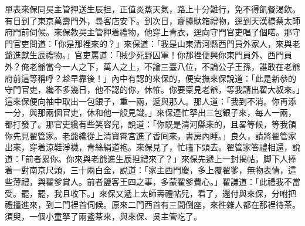 單表來保同吳主管押送生辰担，正值炎蒸天氣，路上十分難行，免不得飢餐渴飲。有日到了東京萬壽門外，尋客店安下。到次日，齎擡馱箱禮物，逕到天漢橋蔡太師府門前伺候。來保教吳主管押着禮物，他穿上青衣，逕向守門官吏唱了個喏。那守門官吏問道：「你是那裡來的？」來保道：「我是山東清河縣西門員外家人，{}來與老爺進獻生辰禮物。」官吏罵道：「賊少死野囚軍！你那裡便興你東門員外、西門員外？俺老爺當今一人之下，萬人之上，不論三臺八位，不論公子王孫，誰敢在老爺府前這等稱呼？{}趁早靠後！」內中有認的來保的，便安撫來保說道：「此是新叅的守門官吏，纔不多幾日，他不認的你，休恠。你要稟見老爺，等我請出翟大叔來。」這來保便向袖中取出一包銀子，重一兩，遞與那人。那人道：「我到不消。你再添一分，與那兩個官吏，休和他一般見識。」{}來保連忙拏出三包銀子來，每人一兩，都打發了。那官吏纔有些笑容兒，說道：「你既是清河縣來的，且畧等候，等我領你先見翟管家。老爺纔從上清寶霄宮進了香囘來，書房內睡。」良久，請將翟管家出來，穿着涼鞋淨襪，青絲絹道袍。來保見了，忙磕下頭去。翟管家答禮相還，說道：「前者累你。你來與老爺進生辰担禮來了？」來保先遞上一封揭帖，脚下人捧着一對南京尺頭，三十兩白金，說道：「家主西門慶，多上覆翟爹，無物表情，這些薄禮，與翟爹賞人。前者鹽客王四之事，多蒙翟爹費心。」翟謙道：「此禮我不當受。罷，罷，我且收下。」來保又遞上太師壽禮帖兒，看了，還付與來保，分咐把禮擡進來，到二門裡首伺候。原來二門西首有三間倒座，來徃雜人都在那裡待茶。須臾，一個小童拏了兩盞茶來，與來保、吳主管吃了。

